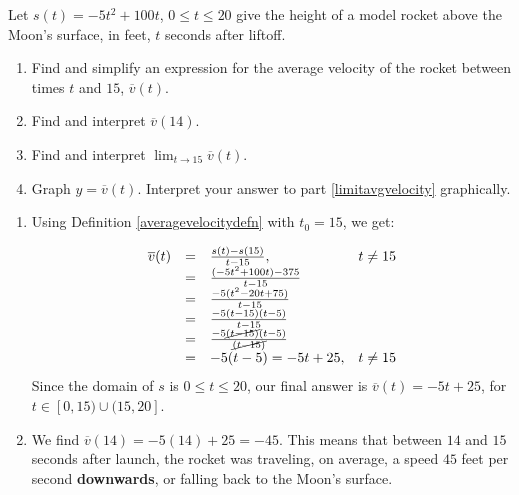 \documentclass{ximera}
\begin{document}
\begin{example} \label{averagevelocityrocketex} Let $s(t) = -5t^2+100t$, $0 \leq t \leq 20$ give the height of a model rocket above the Moon's surface, in feet,  $t$ seconds after liftoff.  

\begin{enumerate}

\item  Find and simplify an expression for the average velocity of the rocket between times $t$ and $15$, $\overline{v}(t)$.

\item Find and interpret $\overline{v}(14)$.

\item \label{limitavgvelocity} Find and interpret $\lim_{t \rightarrow 15} \overline{v}(t)$.

\item  Graph $y = \overline{v}(t)$.  Interpret your answer to part \ref{limitavgvelocity} graphically.

\end{enumerate}

\begin{explanation}

\begin{enumerate}

\item \label{findandsimplifyavgvelocity} Using Definition \ref{averagevelocitydefn} with $t_{0} = 15$, we get: 

\[ \begin{array}{rclr}

 \overline{v}(t) & = & \frac{s(t) - s(15)}{t-15} , & \text{$t \neq 15$}  \\
& =  & \frac{(-5t^2+100t) - 375}{t - 15} &   \\
 & =  & \frac{-5(t^2-20t+75)}{t - 15} &   \\
 & = & \frac{-5(t-15)(t-5)}{t-15} &   \\
 & = &  \frac{-5\cancel{(t-15)} (t-5)}{\cancel{(t-15)}}  & \\
 & = & -5(t-5) = -5t + 25, & \text{$t \neq 15$} \end{array} \]
Since  the domain of $s$ is  $0 \leq t \leq 20$, our final answer is $\overline{v}(t) = -5t+25$,  for $t \in [0, 15) \cup (15, 20]$. 

\item  We find $\overline{v}(14) = -5(14)+25 = -45$.  This means that between  $14$ and $15$ seconds after launch, the rocket was traveling, on average,  a speed $45$ feet per second \textbf{downwards}, or falling back to the Moon's surface.



\end{enumerate}
\end{explanation}
\end{example}
\end{document}
